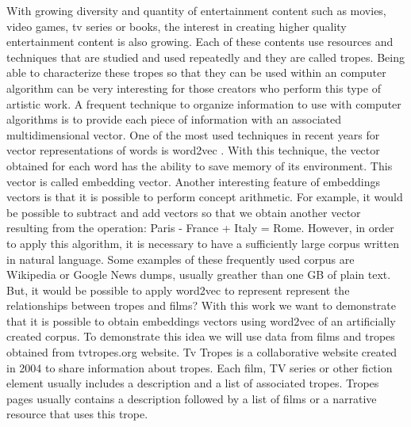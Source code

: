 \documentclass[letterpaper]{article}
\begin{document}
    With growing diversity and quantity of entertainment content such as movies, video games, tv series or books, the interest in creating higher quality entertainment content is also growing.
    Each of these contents use resources and techniques that are studied and used repeatedly and they are called tropes. %
    Being able to characterize these tropes so that they can be used within an computer algorithm can be very interesting for those creators who perform this type of artistic work. %
    A frequent technique to organize information to use with computer algorithms is to provide each piece of information with an associated multidimensional vector. One of the most used techniques in recent years for vector representations of words is word2vec \cite{mikolov2013}.
    With this technique, the vector obtained for each word has the ability to save memory of its environment. %
    This vector is called embedding vector. %
    Another interesting feature of embeddings vectors is that it is possible to perform concept arithmetic. For example, it would be possible to subtract and add vectors so that we obtain another vector resulting from the operation: Paris - France + Italy = Rome. However, in order to apply this algorithm, it is necessary to have a sufficiently large corpus written in natural language. Some examples of these frequently used corpus are Wikipedia or Google News dumps, usually greather than one GB of plain text. \\
    
    But, it would be possible to apply word2vec to represent represent the relationships between tropes and films? %
    With this work we want to demonstrate that it is possible to obtain embeddings vectors using word2vec of an artificially created corpus. To demonstrate this idea we will use data from films and tropes obtained from tvtropes.org website. Tv Tropes is a collaborative website created in 2004 to share information about tropes. Each film, TV series or other
    fiction element usually includes a description and a list of associated
    tropes. Tropes pages usually contains a description followed by a list
    of films or a narrative resource that uses this trope.\\
    
\end{document}
